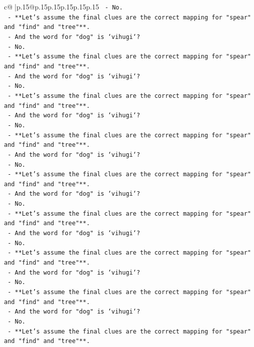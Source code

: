 \documentclass{article}
\begin{document}
{\begin{supertabular}{c@{$\;$}|p{.15\linewidth}@{}p{.15\linewidth}p{.15\linewidth}p{.15\linewidth}p{.15\linewidth}p{.15\linewidth}}
{{{\texttt{  {-} No.} \\
\texttt{  {-} **Let's assume the final clues are the correct mapping for "spear" and "find" and "tree"**.} \\
\texttt{  {-} And the word for "dog" is `vihugi`?} \\
\texttt{  {-} No.} \\
\texttt{  {-} **Let's assume the final clues are the correct mapping for "spear" and "find" and "tree"**.} \\
\texttt{  {-} And the word for "dog" is `vihugi`?} \\
\texttt{  {-} No.} \\
\texttt{  {-} **Let's assume the final clues are the correct mapping for "spear" and "find" and "tree"**.} \\
\texttt{  {-} And the word for "dog" is `vihugi`?} \\
\texttt{  {-} No.} \\
\texttt{  {-} **Let's assume the final clues are the correct mapping for "spear" and "find" and "tree"**.} \\
\texttt{  {-} And the word for "dog" is `vihugi`?} \\
\texttt{  {-} No.} \\
\texttt{  {-} **Let's assume the final clues are the correct mapping for "spear" and "find" and "tree"**.} \\
\texttt{  {-} And the word for "dog" is `vihugi`?} \\
\texttt{  {-} No.} \\
\texttt{  {-} **Let's assume the final clues are the correct mapping for "spear" and "find" and "tree"**.} \\
\texttt{  {-} And the word for "dog" is `vihugi`?} \\
\texttt{  {-} No.} \\
\texttt{  {-} **Let's assume the final clues are the correct mapping for "spear" and "find" and "tree"**.} \\
\texttt{  {-} And the word for "dog" is `vihugi`?} \\
\texttt{  {-} No.} \\
\texttt{  {-} **Let's assume the final clues are the correct mapping for "spear" and "find" and "tree"**.} \\
\texttt{  {-} And the word for "dog" is `vihugi`?} \\
\texttt{  {-} No.} \\
\texttt{  {-} **Let's assume the final clues are the correct mapping for "spear" and "find" and "tree"**.} \\
}}}
\end{supertabular}}
\end{document}
